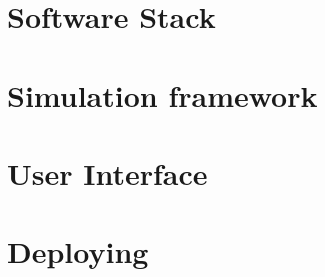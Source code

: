 \section{Software Stack}
\section{Simulation framework}
\section{User Interface}
\section{Deploying}
